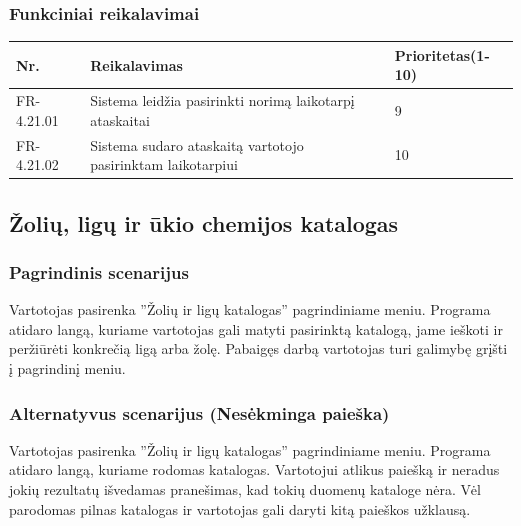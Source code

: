 \documentclass[oneside]{VUMIFPSkursinis}
\begin{document}
	\subsubsection{Funkciniai reikalavimai}
	\begin{table}[htbp]
		\begin{tabularx}{1\textwidth}{ |P{2.5cm}|X|P{3cm }| }  \hline
			Nr. & Reikalavimas & Prioritetas(1-10) \\ \hline
			FR-4.21.01 & Sistema leidžia pasirinkti norimą laikotarpį ataskaitai & 9 \\ \hline
			FR-4.21.02 & Sistema sudaro ataskaitą vartotojo pasirinktam laikotarpiui & 10 \\ \hline	
		\end{tabularx}
	\end{table}
\subsection{Žolių, ligų ir ūkio chemijos katalogas}
	\subsubsection{Pagrindinis scenarijus}
	Vartotojas pasirenka ''Žolių ir ligų katalogas'' pagrindiniame meniu. Programa atidaro langą, kuriame vartotojas gali matyti pasirinktą katalogą, jame ieškoti ir peržiūrėti konkrečią ligą arba žolę. Pabaigęs darbą vartotojas turi galimybę grįšti į pagrindinį meniu.
	\subsubsection{Alternatyvus scenarijus (Nesėkminga paieška)}
	Vartotojas pasirenka ''Žolių ir ligų katalogas'' pagrindiniame meniu. Programa atidaro langą, kuriame rodomas katalogas. Vartotojui atlikus paiešką ir neradus jokių rezultatų išvedamas pranešimas, kad tokių duomenų kataloge nėra. Vėl parodomas pilnas katalogas ir vartotojas gali daryti kitą paieškos užklausą.
\end{document}
